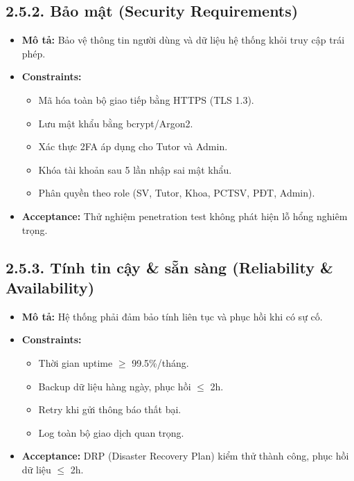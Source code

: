 \subsection*{2.5.2. Bảo mật (Security Requirements)}
\begin{itemize}
    \item \textbf{Mô tả:} Bảo vệ thông tin người dùng và dữ liệu hệ thống khỏi truy cập trái phép.
    \item \textbf{Constraints:}
    \begin{itemize}
        \item Mã hóa toàn bộ giao tiếp bằng HTTPS (TLS 1.3).
        \item Lưu mật khẩu bằng bcrypt/Argon2.
        \item Xác thực 2FA áp dụng cho Tutor và Admin. 
        \item Khóa tài khoản sau 5 lần nhập sai mật khẩu.
        \item Phân quyền theo role (SV, Tutor, Khoa, PCTSV, PĐT, Admin).
    \end{itemize}
    \item \textbf{Acceptance:} Thử nghiệm penetration test không phát hiện lỗ hổng nghiêm trọng.
\end{itemize}


\subsection*{2.5.3. Tính tin cậy \& sẵn sàng (Reliability \& Availability)}
\begin{itemize}
    \item \textbf{Mô tả:} Hệ thống phải đảm bảo tính liên tục và phục hồi khi có sự cố.
    \item \textbf{Constraints:} 
    \begin{itemize}
        \item Thời gian uptime $\geq$ 99.5\%/tháng.
        \item Backup dữ liệu hàng ngày, phục hồi $\leq$ 2h.
        \item Retry khi gửi thông báo thất bại.
        \item Log toàn bộ giao dịch quan trọng.
    \end{itemize}
    \item \textbf{Acceptance:} DRP (Disaster Recovery Plan) kiểm thử thành công, phục hồi dữ liệu $\leq$ 2h.
\end{itemize}

